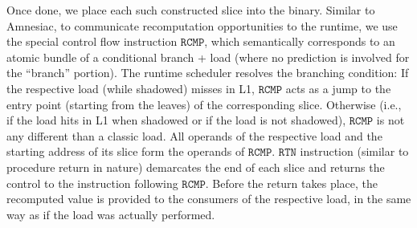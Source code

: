 Once done, we place 
each such constructed slice into the binary. 
Similar to Amnesiac, to communicate recomputation opportunities to the runtime, we use 
the special control flow instruction $\texttt{RCMP}$, which semantically corresponds to an atomic bundle of a conditional branch + load (where no prediction is involved for the ``branch'' portion).
The runtime scheduler resolves the branching condition: If the respective load (while shadowed) misses in L1, $\texttt{RCMP}$ acts as a jump to the entry point (starting from the
leaves) of the corresponding slice. Otherwise (i.e., if the load hits in L1 when shadowed or if the load is not shadowed), $\texttt{RCMP}$ is not any different than a classic load.
All operands of
the respective load and the starting address of its slice form the operands of $\texttt{RCMP}$. 
$\texttt{RTN}$ instruction (similar to procedure return in nature) demarcates the end of each slice and returns the control to the instruction following $\texttt{RCMP}$. Before the return takes place, the recomputed value is provided to the consumers of the respective load, in the same way as if the load was actually performed. 
%
